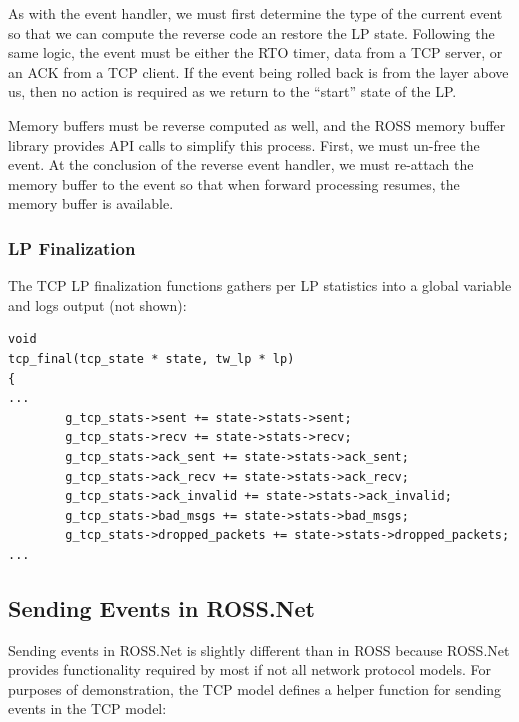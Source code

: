 \documentclass[12pt]{article}
\begin{document}
As with the event handler, we must first determine the type of the current
event so that we can compute the reverse code an restore the LP state.
Following the same logic, the event must be either the RTO timer, data from a
TCP server, or an ACK from a TCP client.  If the event being rolled back is
from the layer above us, then no action is required as we return to the
``start'' state of the LP.

Memory buffers must be reverse computed as well, and the ROSS memory buffer
library provides API calls to simplify this process.  First, we must un-free
the event.  At the conclusion of the reverse event handler, we must re-attach
the memory buffer to the event so that when forward processing resumes, the
memory buffer is available.

\subsubsection{LP Finalization}

The TCP LP finalization functions gathers per LP statistics into a global variable and logs output (not shown):

\begin{small}
\begin{verbatim}
void
tcp_final(tcp_state * state, tw_lp * lp)
{
...
        g_tcp_stats->sent += state->stats->sent;
        g_tcp_stats->recv += state->stats->recv;
        g_tcp_stats->ack_sent += state->stats->ack_sent;
        g_tcp_stats->ack_recv += state->stats->ack_recv;
        g_tcp_stats->ack_invalid += state->stats->ack_invalid;
        g_tcp_stats->bad_msgs += state->stats->bad_msgs;
        g_tcp_stats->dropped_packets += state->stats->dropped_packets;
...
\end{verbatim}
\end{small}

\subsection{Sending Events in ROSS.Net}

Sending events in ROSS.Net is slightly different than in ROSS because ROSS.Net
provides functionality required by most if not all network protocol models.
For purposes of demonstration, the TCP model defines a helper function for
sending events in the TCP model:
\end{document}

